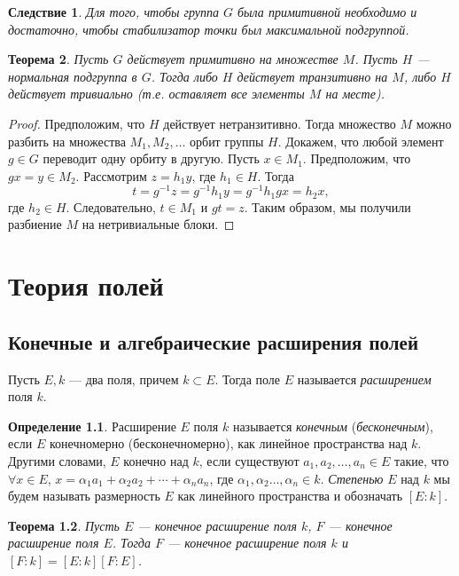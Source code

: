 \documentclass[12pt, titlepage, oneside]{amsbook}
\newtheorem{theorem}{Теорема}[chapter]
\newtheorem{corollary}[theorem]{Следствие}
\theoremstyle{definition}
\newtheorem{definition}[theorem]{Определение}
\theoremstyle{remark}
\begin{document}
\begin{corollary}
\label{Tr4}
Для того, чтобы группа $G$ была примитивной необходимо и достаточно, чтобы стабилизатор точки был максимальной подгруппой.
\end{corollary}

\begin{theorem}
\label{Tr5} Пусть $G$ действует примитивно на множестве $M$. Пусть $H$ --- нормальная подгруппа в $G$. Тогда либо $H$ действует транзитивно на $M$, либо $H$ действует тривиально (т.е. оставляет все элементы $M$ на месте).
\end{theorem}

\begin{proof}
Предположим, что $H$ действует нетранзитивно. Тогда множество $M$ можно разбить на множества $M_1,M_2,\ldots$ орбит группы $H$. Докажем, что любой элемент $g\in G$ переводит одну орбиту в другую. Пусть $x\in M_1$. Предположим, что $g x=y\in M_2$. Рассмотрим $z=h_1y$, где $h_1\in H$. Тогда $$t=g^{-1}z= g^{-1}h_1y=g^{-1}h_1g x=h_2 x,$$ где $h_2\in H$. Следовательно, $t\in M_1$ и $gt=z$. Таким образом, мы получили разбиение $M$ на нетривиальные блоки.
\end{proof}


\chapter{Теория полей}

\section{Конечные и алгебраические расширения полей}

Пусть $E,k$ --- два поля, причем $k\subset E$. Тогда поле $E$ называется \emph{расширением} поля $k$.

\begin{definition}
Расширение $E$  поля $k$ называется \emph{конечным} (\emph{бесконечным}), если $E$ конечномерно (бесконечномерно), как линейное пространства над $k$. Другими словами, $E$ конечно над $k$, если существуют $a_1,a_2,\ldots, a_n\in E$ такие, что $\forall x\in E$, $x=\alpha_1 a_1+\alpha_2 a_2+\cdots+\alpha_n a_n$, где $\alpha_1,\alpha_2\ldots,\alpha_n\in k$. \emph{Степенью} $E$ над $k$ мы будем называть размерность $E$ как линейного пространства и обозначать $[E:k]$.
\end{definition}

\begin{theorem}
\label{Ras1} Пусть $E$ --- конечное расширение поля $k$, $F$ --- конечное расширение поля $E$. Тогда $F$ --- конечное расширение поля $k$ и $[F:k]=[E:k][F:E]$.
\end{theorem}
\end{document}
